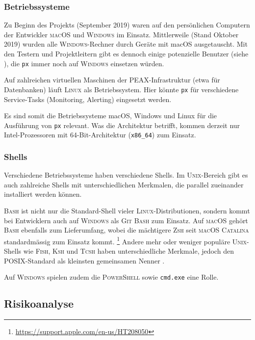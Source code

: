 \subsubsection{Betriebssysteme}

Zu Beginn des Projekts (September 2019) waren auf den persönlichen Computern der Entwickler \textsc{macOS} und \textsc{Windows} im Einsatz. Mittlerweile (Stand Oktober 2019) wurden alle \textsc{Windows}-Rechner durch Geräte mit macOS ausgetauscht. Mit den Testern und Projektleitern gibt es dennoch einige potenzielle Benutzer (siehe ), die \texttt{px} immer noch auf \textsc{Windows} einsetzen würden.

Auf zahlreichen virtuellen Maschinen der PEAX-Infrastruktur (etwa für Datenbanken) läuft \textsc{Linux} als Betriebssystem. Hier könnte \texttt{px} für verschiedene Service-Tasks (Monitoring, Alerting) eingesetzt werden.

Es sind somit die Betriebssysteme macOS, Windows und Linux für die Ausführung von \texttt{px} relevant. Was die Architektur betrifft, kommen derzeit nur Intel-Prozessoren mit 64-Bit-Architektur (\texttt{x86\_64}) zum Einsatz.

\subsubsection{Shells} 

Verschiedene Betriebssysteme haben verschiedene Shells. Im \textsc{Unix}-Bereich gibt es auch zahlreiche Shells mit unterschiedlichen Merkmalen, die parallel zueinander installiert werden können.

\textsc{Bash} ist nicht nur die Standard-Shell vieler \textsc{Linux}-Distributionen, sondern kommt bei Entwicklern auch auf \textsc{Windows} als \textsc{Git Bash} zum Einsatz. Auf \textsc{macOS} gehört \textsc{Bash} ebenfalls zum Lieferumfang, wobei die mächtigere \textsc{Zsh} seit \textsc{macOS Catalina} standardmässig zum Einsatz kommt. \footnote{\url{https://support.apple.com/en-us/HT208050}} Andere mehr oder weniger populäre \textsc{Unix}-Shells wie \textsc{Fish}, \textsc{Ksh} und \textsc{Tcsh} haben unterschiedliche Merkmale, jedoch den \textsc{POSIX}-Standard als kleinsten gemeinsamen Nenner \cite{posix-shell}.

Auf \textsc{Windows} spielen zudem die \textsc{PowerShell} sowie \texttt{cmd.exe} eine Rolle.

\subsection{Risikoanalyse}
\label{sec:Risikoanalyse}

